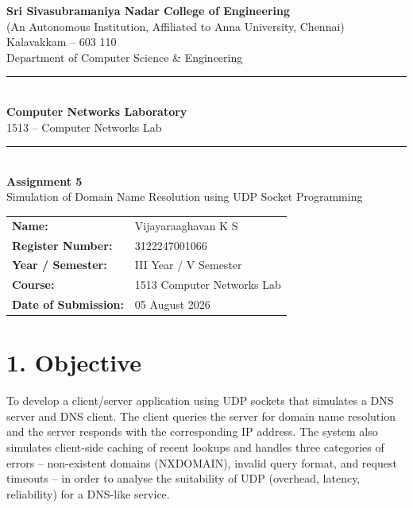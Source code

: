 \documentclass[11pt]{article}
\title{\vspace{-2cm}}
\date{}
\begin{document}
\begin{titlepage}
\centering
\vspace*{1cm}
{\large \textbf{Sri Sivasubramaniya Nadar College of Engineering}}\\
{\small (An Autonomous Institution, Affiliated to Anna University, Chennai)}\\
{\small Kalavakkam -- 603 110}\\[0.3cm]
{\small Department of Computer Science \& Engineering}\\[1.5cm]

\rule{\linewidth}{0.5mm}\\[0.4cm]
{\LARGE \textbf{Computer Networks Laboratory}}\\[0.3cm]
{\Large 1513 -- Computer Networks Lab}\\[0.4cm]
\rule{\linewidth}{0.5mm}\\[1.5cm]

{\huge \textbf{Assignment 5}}\\[0.4cm]
{\Large Simulation of Domain Name Resolution using UDP Socket Programming}\\[2cm]

\begin{center}
\begin{tabular}{ll}
\textbf{Name:} & Vijayaraaghavan K S \\[0.2cm]
\textbf{Register Number:} & 3122247001066 \\[0.2cm]
\textbf{Year / Semester:} & III Year / V Semester \\[0.2cm]
\textbf{Course:} & 1513 Computer Networks Lab \\[0.2cm]
\textbf{Date of Submission:} & 05 August 2026 \\[0.2cm]
\end{tabular}
\end{center}

\vfill
\end{titlepage}

\section*{1. Objective}
To develop a client/server application using UDP sockets that simulates a DNS server and DNS
client. The client queries the server for domain name resolution and the server responds with
the corresponding IP address. The system also simulates client-side caching of recent lookups
and handles three categories of errors -- non-existent domains (NXDOMAIN), invalid query
format, and request timeouts -- in order to analyse the suitability of UDP (overhead, latency,
reliability) for a DNS-like service.
\end{document}
